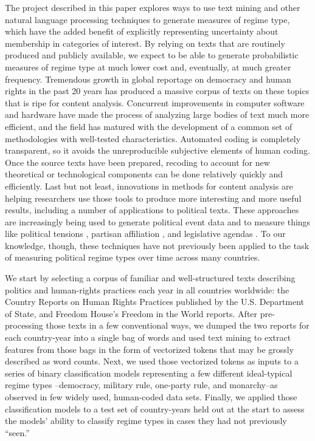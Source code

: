 \documentclass[pdftex,12pt,fullpage,oneside]{amsart}
\begin{document}
The project described in this paper explores ways to use text mining and other natural language processing techniques to generate measures of regime type, which have the added benefit of explicitly representing uncertainty about membership in categories of interest. By relying on texts that are routinely produced and publicly available, we expect to be able to generate probabilistic measures of regime type at much lower cost and, eventually, at much greater frequency. Tremendous growth in global reportage on democracy and human rights in the past 20 years has produced a massive corpus of texts on these topics that is ripe for content analysis. Concurrent improvements in computer software and hardware have made the process of analyzing large bodies of text much more efficient, and the field has matured with the development of a common set of methodologies with well-tested characteristics. Automated coding is completely transparent, so it avoids the unreproducible subjective elements of human coding. Once the source texts have been prepared, recoding to account for new theoretical or technological components can be done relatively quickly and efficiently. Last but not least, innovations in methods for content analysis are helping researchers use those tools to produce more interesting and more useful results, including a number of applications to political texts. These approaches are increasingly being used to generate political event data \cite{dorazio:etal:2014,king:lowe:2003,oconnor:etal:2013} and to measure things like political tensions \cite{chadefaux:2014}, partisan affiliation \citep{slapin:proksch:2010,yu:etal:2008}, and legislative agendas \citep{grimmer:2010}. To our knowledge, though, these techniques have not previously been applied to the task of measuring political regime types over time across many countries.

We start by selecting a corpus of familiar and well-structured texts describing politics and human-rights practices each year in all countries worldwide: the Country Reports on Human Rights Practices published by the U.S. Department of State, and Freedom House's Freedom in the World reports. After pre-processing those texts in a few conventional ways, we dumped the two reports for each country-year into a single bag of words and used text mining to extract features from those bags in the form of vectorized tokens that may be grossly described as word counts. Next, we used those vectorized tokens as inputs to a series of binary classification models representing a few different ideal-typical regime types --democracy, military rule, one-party rule, and monarchy--as observed in few widely used, human-coded data sets. Finally, we applied those classification models to a test set of country-years held out at the start to assess the models' ability to classify regime types in cases they had not previously ``seen.''
\end{document}
